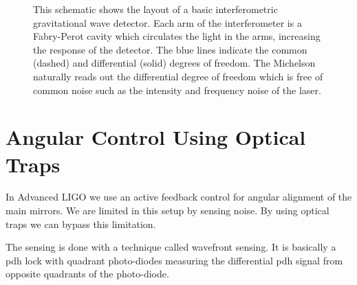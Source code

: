 \begin{figure}
\centering
{}
\caption[LIGO Schematic]{This schematic shows the layout of a basic
    interferometric gravitational wave detector.
    Each arm of the interferometer is a Fabry-Perot cavity which circulates
    the light in the arms, increasing the response of the detector.
    The blue lines indicate the common (dashed) and differential (solid)
    degrees of freedom.
    The Michelson naturally reads out the differential degree of freedom which
    is free of common noise such as the intensity and frequency noise of the
    laser.
    }
\label{fig:ligoschematic}
\end{figure}


\section{Angular Control Using Optical Traps}

In Advanced LIGO we use an active feedback control for angular alignment of
the main mirrors.
We are limited in this setup by sensing noise.
By using optical traps we can bypass this limitation.

The sensing is done with a technique called wavefront sensing.
It is basically a \ac{pdh} lock with quadrant photo-diodes measuring
the differential \ac{pdh} signal from opposite quadrants of the photo-diode.

